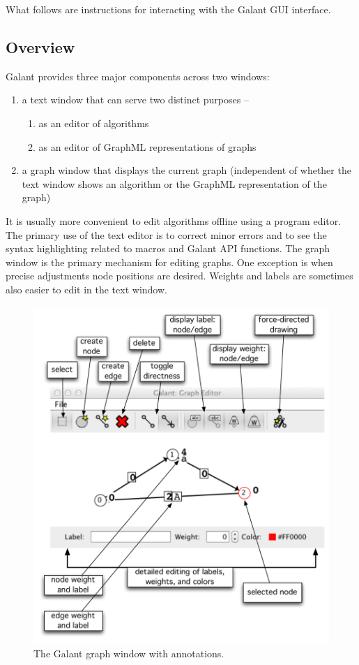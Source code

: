 
What follows are instructions for interacting with the Galant GUI interface.

\subsection{Overview}

Galant provides three major components across two windows:
\begin{enumerate}
\item
a text window that can serve two distinct purposes --
\begin{enumerate}
\item as an editor of algorithms
\item as an editor of GraphML representations of graphs
\end{enumerate}
\item
a graph window that displays the current graph (independent of whether
the text window shows an algorithm or the GraphML representation of the graph)
\end{enumerate}

It is usually more convenient to edit algorithms
offline using a program editor.
The primary use of the text editor is to correct minor errors and
to see the syntax highlighting related to macros and Galant API functions.
The graph window is the primary mechanism for editing graphs.
One exception is when precise adjustments node positions are desired.
Weights and labels are sometimes also easier to edit in the text window.

\begin{figure}[p!]
\includegraphics[scale=0.5]{X_graph_window_annotated}
\caption{The Galant graph window with annotations.}
\label{fig:graph_window_annotated}
\end{figure}


